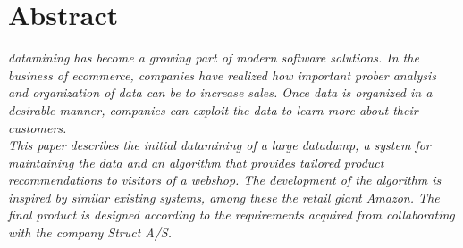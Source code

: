 \chapter{Abstract}
\textit{\Gls{datamining} has become a growing part of modern software solutions. In the business of \gls{ecommerce}, companies have realized how important prober analysis and organization of data can be to increase sales. Once data is organized in a desirable manner, companies can exploit the data to learn more about their customers.\\
This paper describes the initial datamining of a large datadump, a system for maintaining the data and an algorithm that provides tailored product recommendations to visitors of a webshop.
The development of the algorithm is inspired by similar existing systems, among these the retail giant Amazon. The final product is designed according to the requirements acquired from collaborating with the company Struct A/S.}